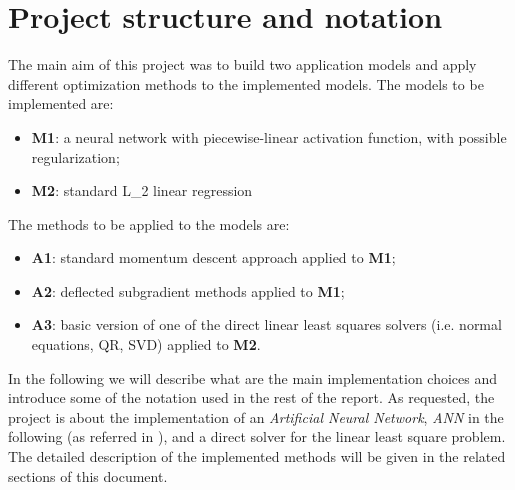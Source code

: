 \section{Project structure and notation}
The main aim of this project was to build two application models and apply different optimization methods to the implemented models.\newline
The models to be implemented are:
\begin{itemize}
    \item \textbf{M1}: a neural network with piecewise-linear activation function, with possible regularization;
    \item \textbf{M2}: standard L\_2 linear regression
\end{itemize}
The methods to be applied to the models are:
\begin{itemize}
    \item \textbf{A1}: standard momentum descent approach applied to \textbf{M1};
    \item \textbf{A2}: deflected subgradient methods applied to \textbf{M1};
    \item \textbf{A3}: basic version of one of the direct linear least squares solvers (i.e. normal equations, QR, SVD) applied to \textbf{M2}.
\end{itemize}
In the following we will describe what are the main implementation choices and introduce some of the notation used in the rest of the report.\newline
As requested, the project is about the implementation of an \textit{Artificial Neural Network}, \textit{ANN} in the following (as referred in \cite{MLmitchell}), and a direct solver for the linear least square problem. The detailed description of the implemented methods will be given in the related sections of this document.